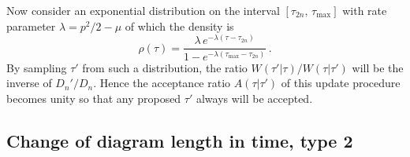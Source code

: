 Now consider an exponential distribution on the interval $ [\tau_{2n}, \, \tau_\text{max}] $ with rate parameter $ \lambda = p^2/2 - \mu $ of which the density is
\begin{equation}
	\rho(\tau) = \frac{\lambda \, e^{-\lambda (\tau - \tau_{2n})}}{1 - e^{- \lambda (\tau_\text{max} - \tau_{2n})}} \,.
\end{equation}
By sampling $ \tau' $ from such a distribution, the ratio $ W(\tau' | \tau)/W(\tau | \tau') $ will be the inverse of $ D_n'/D_n $. Hence the acceptance ratio $ A(\tau | \tau') $ of this update procedure becomes unity so that any proposed $ \tau' $ always will be accepted.

\subsection*{Change of diagram length in time, type 2}

